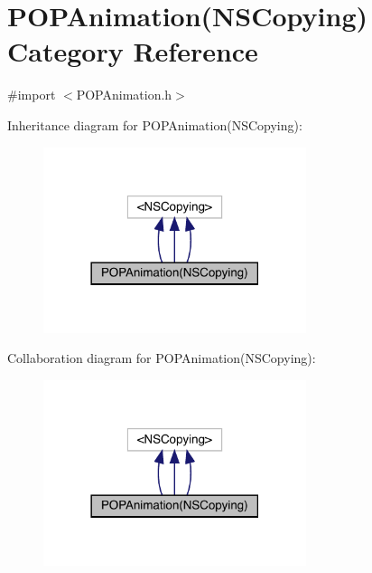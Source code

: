 \hypertarget{category_p_o_p_animation_07_n_s_copying_08}{}\section{P\+O\+P\+Animation(N\+S\+Copying) Category Reference}
\label{category_p_o_p_animation_07_n_s_copying_08}


{\ttfamily \#import $<$P\+O\+P\+Animation.\+h$>$}



Inheritance diagram for P\+O\+P\+Animation(N\+S\+Copying)\+:\nopagebreak
\begin{figure}[H]
\begin{center}
\leavevmode
\includegraphics[width=218pt]{category_p_o_p_animation_07_n_s_copying_08__inherit__graph}
\end{center}
\end{figure}


Collaboration diagram for P\+O\+P\+Animation(N\+S\+Copying)\+:\nopagebreak
\begin{figure}[H]
\begin{center}
\leavevmode
\includegraphics[width=218pt]{category_p_o_p_animation_07_n_s_copying_08__coll__graph}
\end{center}
\end{figure}



